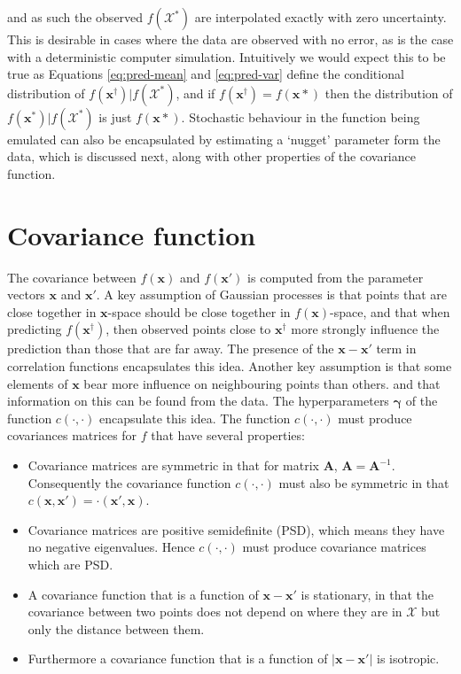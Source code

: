 \documentclass[
  12pt,
  a4paper,
  twoside]{book}
\providecommand{\tightlist}{%
  \setlength{\itemsep}{0pt}\setlength{\parskip}{0pt}}
\begin{document}
and as such the observed \(f(\mathcal{X^*})\) are interpolated exactly with zero uncertainty. This is desirable in cases where the data are observed with no error, as is the case with a deterministic computer simulation. Intuitively we would expect this to be true as Equations \eqref{eq:pred-mean} and \eqref{eq:pred-var} define the conditional distribution of \(f(\mathbf{x}^\dagger)|f(\mathcal{X^*})\), and if \(f(\mathbf{x}^\dagger)=f(\mathbf{x*})\) then the distribution of \(f(\mathbf{x^*})|f(\mathcal{X^*})\) is just \(f(\mathbf{x*})\). Stochastic behaviour in the function being emulated can also be encapsulated by estimating a `nugget' parameter form the data, which is discussed next, along with other properties of the covariance function.

\hypertarget{covariance}{%
\section{Covariance function}\label{covariance}}

The covariance between \(f(\mathbf{x})\) and \(f(\mathbf{x'})\) is computed from the parameter vectors \(\mathbf{x}\) and \(\mathbf{x'}\). A key assumption of Gaussian processes is that points that are close together in \(\mathbf{x}\)-space should be close together in \(f(\mathbf{x})\)-space, and that when predicting \(f(\mathbf{x^\dagger})\), then observed points close to \(\mathbf{x^\dagger}\) more strongly influence the prediction than those that are far away. The presence of the \(\mathbf{x}-\mathbf{x}'\) term in correlation functions encapsulates this idea. Another key assumption is that some elements of \(\mathbf{x}\) bear more influence on neighbouring points than others. and that information on this can be found from the data. The hyperparameters \(\mathbf{\gamma}\) of the function \(c(\cdot, \cdot)\) encapsulate this idea. The function \(c(\cdot, \cdot)\) must
produce covariances matrices for \(f\) that have several properties:

\begin{itemize}
\tightlist
\item
  Covariance matrices are symmetric in that for matrix \(\mathbf{A}\), \(\mathbf{A}=\mathbf{A}^{-1}\). Consequently the covariance function \(c(\cdot, \cdot)\) must also be symmetric in that \(c(\mathbf{x}, \mathbf{x'}) = \cdot(\mathbf{x'}, \mathbf{x})\).
\item
  Covariance matrices are positive semidefinite (PSD), which means they have no negative eigenvalues. Hence \(c(\cdot,\cdot)\) must produce covariance matrices which are PSD.
\item
  A covariance function that is a function of \(\mathbf{x} - \mathbf{x'}\) is stationary, in that the covariance between two points does not depend on where they are in \(\mathcal{X}\) but only the distance between them.
\item
  Furthermore a covariance function that is a function of \(|\mathbf{x} - \mathbf{x'}|\) is isotropic.
\end{itemize}
\end{document}
